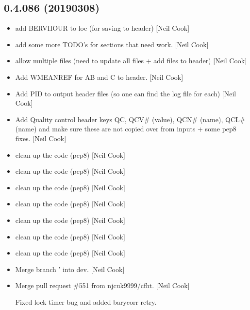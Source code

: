 \documentclass[a4paper,10pt,english]{report}
\begin{document}
\subsection{0.4.086 (2019\sphinxhyphen{}03\sphinxhyphen{}08)}
\label{\detokenize{misc/changelog:id194}}\begin{itemize}
\item {} 
 \sphinxhyphen{} add BERVHOUR to loc (for saving to header) {[}Neil Cook{]}

\item {} 
 \sphinxhyphen{} add some more TODO’s for sections that
need work. {[}Neil Cook{]}

\item {} 
 \sphinxhyphen{} allow multiple files (need to update all files + add files to
header) {[}Neil Cook{]}

\item {} 
Add WMEANREF for AB and C to header. {[}Neil Cook{]}

\item {} 
Add PID to output header files (so one can find the log file for each)
{[}Neil Cook{]}

\item {} 
Add Quality control header keys QC, QCV\# (value), QCN\# (name), QCL\#
(name) \sphinxhyphen{} and make sure these are not copied over from inputs + some
pep8 fixes. {[}Neil Cook{]}

\item {} 
 \sphinxhyphen{} clean up the code (pep8) {[}Neil Cook{]}

\item {} 
 \sphinxhyphen{} clean up the code (pep8) {[}Neil Cook{]}

\item {} 
 \sphinxhyphen{} clean up the code (pep8) {[}Neil Cook{]}

\item {} 
 \sphinxhyphen{} clean up the code (pep8) {[}Neil Cook{]}

\item {} 
 \sphinxhyphen{} clean up the code (pep8) {[}Neil Cook{]}

\item {} 
 \sphinxhyphen{} clean up the code (pep8) {[}Neil Cook{]}

\item {} 
 \sphinxhyphen{} clean up the code (pep8) {[}Neil Cook{]}

\item {} 
Merge branch ’ into dev. {[}Neil Cook{]}

\item {} 
Merge pull request \#551 from njcuk9999/cfht. {[}Neil Cook{]}

Fixed lock timer bug and added barycorr retry.

\end{itemize}
\end{document}
